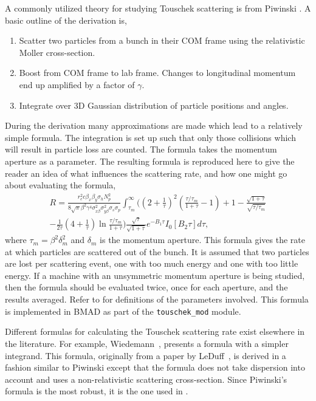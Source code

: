 A commonly utilized theory for studying Touschek scattering is from Piwinski \cite{b:piwinski}.  A
basic outline of the derivation is,
\begin{enumerate}
\item Scatter two particles from a bunch in their COM frame using the relativistic
Moller cross-section.
\item Boost from COM frame to lab frame.  Changes to longitudinal momentum end up 
amplified by a factor of $\gamma$.
\item Integrate over 3D Gaussian distribution of particle positions and angles.
\end{enumerate}
During the derivation many approximations are made which lead to a relatively simple formula.  The
integration is set up such that only those collisions which will result in particle loss are
counted.  The formula takes the momentum aperture as a parameter.  The resulting formula is
reproduced here to give the reader an idea of what influences the scattering rate, and how one might
go about evaluating the formula,
\begin{multline}
R=\frac{r_e^2 c\beta_x\beta_y\sigma_h N_p^2}{8\sqrt\pi\beta^2\gamma^4\sigma_{x\beta}^2
\sigma_{y\beta}^2\sigma_s\sigma_p}\int_{\tau_m}^\infty\Bigg(
\left(2+\frac{1}{\tau}\right)^2\left(\frac{\tau/\tau_m}{1+\tau}-1\right)+1
-\frac{\sqrt{1+\tau}}{\sqrt{\tau/\tau_m}}\\
-\frac{1}{2\tau}\left(4+\frac{1}{\tau}\right)\ln\frac{\tau/\tau_m}{1+\tau}\Bigg)
\frac{\sqrt\tau}{\sqrt{1+\tau}}e^{-B_1\tau}I_0\left[B_2\tau\right]d\tau,
\end{multline}
where $\tau_m=\beta^2\delta_m^2$ and $\delta_m$ is the momentum aperture.  This formula gives the
rate at which particles are scattered out of the bunch.  It is assumed that two particles are lost
per scattering event, one with too much energy and one with too little energy.  If a machine with an
unsymmetric momentum aperture is being studied, then the formula should be evaluated twice, once for
each aperture, and the results averaged.  Refer to \cite{b:piwinski} for definitions of the
parameters involved.  This formula is implemented in BMAD as part of the {\tt touschek\_mod} module.

Different formulas for calculating the Touschek scattering rate exist elsewhere in the literature.
For example, Wiedemann~\cite{b:wiedemann}, presents a formula with a simpler integrand.  This
formula, originally from a paper by LeDuff~\cite{b:leduff}, is derived in a fashion similar to
Piwinski except that the formula does not take dispersion into account and uses a non-relativistic
scattering cross-section.  Since Piwinski's formula is the most robust, it is the one used in \bmad.

